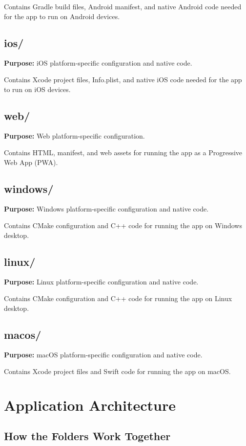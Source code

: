 \documentclass[12pt,a4paper]{article}
\begin{document}
Contains Gradle build files, Android manifest, and native Android code needed for the app to run on Android devices.

\subsection{ios/}
\textbf{Purpose:} iOS platform-specific configuration and native code.

Contains Xcode project files, Info.plist, and native iOS code needed for the app to run on iOS devices.

\subsection{web/}
\textbf{Purpose:} Web platform-specific configuration.

Contains HTML, manifest, and web assets for running the app as a Progressive Web App (PWA).

\subsection{windows/}
\textbf{Purpose:} Windows platform-specific configuration and native code.

Contains CMake configuration and C++ code for running the app on Windows desktop.

\subsection{linux/}
\textbf{Purpose:} Linux platform-specific configuration and native code.

Contains CMake configuration and C++ code for running the app on Linux desktop.

\subsection{macos/}
\textbf{Purpose:} macOS platform-specific configuration and native code.

Contains Xcode project files and Swift code for running the app on macOS.

\section{Application Architecture}

\subsection{How the Folders Work Together}
\end{document}
